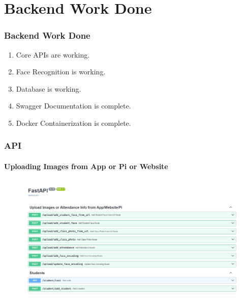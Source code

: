 \documentclass[aspectratio=169]{beamer}
\begin{document}
\section{Backend Work Done}
\begin{frame}
	\centering
	\frametitle{Backend Work Done}
	\begin{minipage}{0.95\textwidth}
		\begin{enumerate}
			\item Core APIs are working.
			\item Face Recognition is working.
			\item Database is working.
			\item Swagger Documentation is complete.
			\item Docker Containerization is complete.
		\end{enumerate}
	\end{minipage}
\end{frame}

\begin{frame}
	\centering
	\frametitle{API}
	\framesubtitle{Uploading Images from App or Pi or Website}
	\begin{minipage}{0.95\textwidth}
		\begin{figure}[H]
			\centering
			\includegraphics[width=.95\textwidth]{swagger 1.jpg}
		\end{figure}
	\end{minipage}
\end{frame}
\end{document}
